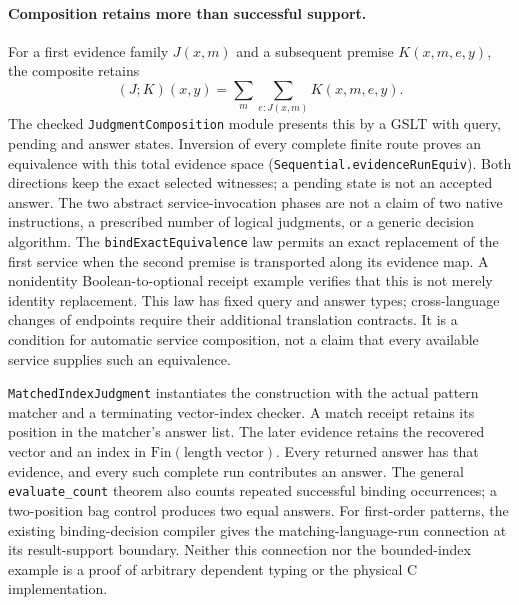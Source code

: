 \documentclass[11pt]{article}
\theoremstyle{definition}
\theoremstyle{remark}
\begin{document}
\paragraph{Composition retains more than successful support.}
For a first evidence family $J(x,m)$ and a subsequent premise
$K(x,m,e,y)$, the composite retains
\[
  (J\mathbin{; }K)(x,y)
    =\sum_m\sum_{e:J(x,m)}K(x,m,e,y).
\]
The checked \nolinkurl{JudgmentComposition} module presents this by a GSLT
with query, pending and answer states. Inversion of every complete finite
route proves an equivalence with this total evidence space
(\nolinkurl{Sequential.evidenceRunEquiv}). Both directions keep the exact
selected witnesses; a pending state is not an accepted answer. The two
abstract service-invocation phases are not a claim of two native instructions,
a prescribed number of logical judgments, or a generic decision algorithm.
The \nolinkurl{bindExactEquivalence} law permits an exact replacement of
the first service when the second premise is transported along its evidence
map. A nonidentity Boolean-to-optional receipt example verifies that this is
not merely identity replacement. This law has fixed query and answer types;
cross-language changes of endpoints require their additional translation
contracts. It is a condition for automatic service composition, not a claim
that every available service supplies such an equivalence.

\nolinkurl{MatchedIndexJudgment} instantiates the construction with the
actual pattern matcher and a terminating vector-index checker. A match
receipt retains its position in the matcher's answer list. The later evidence
retains the recovered vector and an index in $\mathrm{Fin}(\mathrm{length}
\;\mathrm{vector})$. Every returned answer has that evidence, and every such
complete run contributes an answer. The general \nolinkurl{evaluate_count}
theorem also counts repeated successful binding occurrences; a two-position
bag control produces two equal answers. For first-order patterns, the existing
binding-decision compiler gives the matching-language-run connection at its
result-support boundary. Neither this connection nor the bounded-index example
is a proof of arbitrary dependent typing or the physical C implementation.
\end{document}
